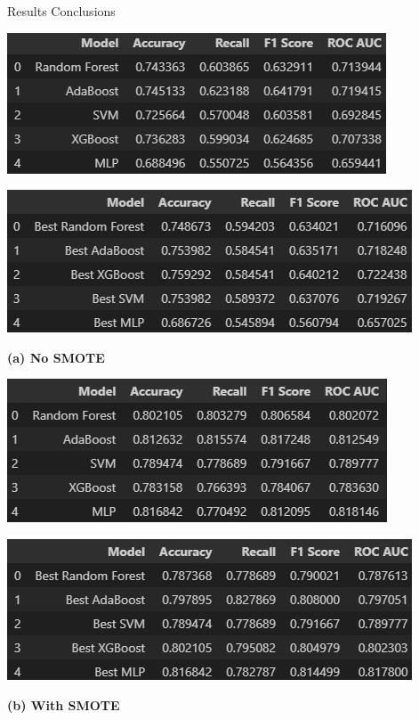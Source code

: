 \documentclass{beamer}
\begin{document}
\begin{frame}{Results Conclusions}
    \centering
    \begin{minipage}{0.45\linewidth}
        \centering
        \includegraphics[width=\linewidth]{images/models_result_nosmote.png}\vspace{0.5em}
        
        \includegraphics[width=\linewidth]{images/best_model_results_nosmote.png}
        
        \vspace{0.5em}
        \textbf{(a) No SMOTE}
    \end{minipage}
    \hspace{1cm}
    \begin{minipage}{0.45\linewidth}
        \centering
        \includegraphics[width=\linewidth]{images/model_results.png}\vspace{0.5em}
        
        \includegraphics[width=\linewidth]{images/best_model_results.png}
        
        \vspace{0.5em}
        \textbf{(b) With SMOTE}
    \end{minipage}
\end{frame}
\end{document}
